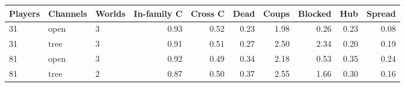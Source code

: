 \begin{tabular}{@{}lllrrrrrrr@{}}
\toprule
Players & Channels & Worlds & In-family C & Cross C & Dead & Coups & Blocked & Hub & Spread \\
\midrule
31 & open & 3 & 0.93 & 0.52 & 0.23 & 1.98 & 0.26 & 0.23 & 0.08 \\
31 & tree & 3 & 0.91 & 0.51 & 0.27 & 2.50 & 2.34 & 0.20 & 0.19 \\
81 & open & 3 & 0.92 & 0.49 & 0.34 & 2.18 & 0.53 & 0.35 & 0.24 \\
81 & tree & 2 & 0.87 & 0.50 & 0.37 & 2.55 & 1.66 & 0.30 & 0.16 \\
\bottomrule
\end{tabular}
